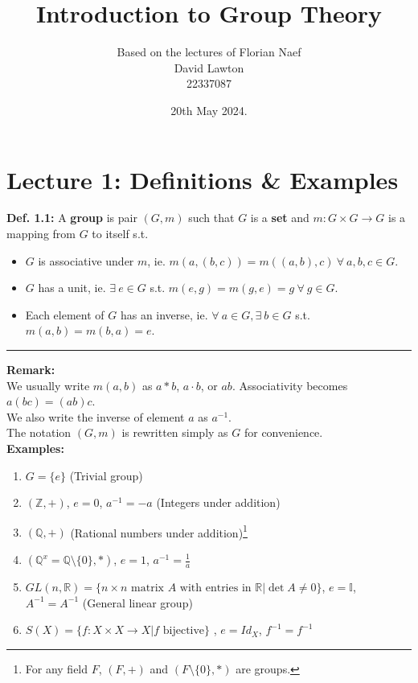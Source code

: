 \documentclass{article}
\title{Introduction to Group Theory}
\author{Based on the lectures of Florian Naef\\David Lawton\\22337087}
\date{20th May 2024.}
\begin{document}
\maketitle
\vfill
\tableofcontents

\newpage

\section{Lecture 1: Definitions \& Examples}
\textbf{Def. 1.1:} A \textbf{group} is pair $(G,m)$ such that $G$ is a \textbf{set} and $m: G\times G \rightarrow G$ is a mapping from $G$ to itself s.t.
\begin{itemize}
\item $G$ is associative under $m$, ie. $m(a,(b,c))=m((a,b),c) ~\forall ~a,b,c\in G$.
\item $G$ has a unit, ie. $\exists ~e\in G$ s.t. $ m(e,g)=m(g,e)=g~\forall ~ g\in G$.
\item Each element of $G$ has an inverse, ie. $\forall~a\in G, \exists ~b\in G$ s.t. $ m(a,b)=m(b,a)=e$.
\end{itemize}
\hrule
\vspace{3mm}
\textbf{Remark:} \\
We usually write $m(a,b)$ as $a*b$, $ a\cdot b$, or $ab$. Associativity becomes $a(bc)=(ab)c$. \\ We also write the inverse of element $a$ as $a^{-1}$. \\ The notation $(G,m) $ is rewritten simply as $G$ for convenience.
\vspace{2mm}~\\
\textbf{Examples:}
\begin{enumerate}
\item $G=\lbrace e\rbrace$ (Trivial group)
\item $(\mathbb{Z}, +)$, $e=0$, $a^{-1}=-a$ (Integers under addition)
\item $(\mathbb{Q}, +)$ (Rational numbers under addition)\footnote{For any field $F$, $(F,+)$ and $(F\setminus\lbrace 0\rbrace, *)$ are groups.}
\item $(\mathbb{Q}^x=\mathbb{Q}\setminus \lbrace 0\rbrace, *)$, $e=1$, $a^{-1}=\frac{1}{a}$
\item $GL(n,\mathbb{R})= \lbrace n\times n \text{ matrix } A \text{ with entries in } \mathbb{R}|\det A \neq 0 \rbrace$, $e = \mathbb{I}$, $A^{-1}=A^{-1}$ (General linear group)
\item $S(X)=\lbrace f:X\times X \rightarrow X | f \text{ bijective}\rbrace$ , $ e=Id_X$, $f^{-1}=f^{-1}$ 
\end{enumerate}
\end{document}
